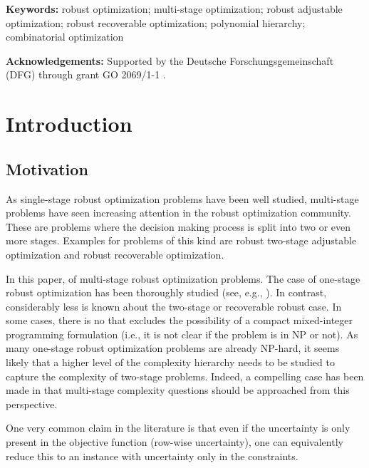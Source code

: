 \documentclass[a4paper,abstracton]{scrartcl}
\begin{document}
\noindent\textbf{Keywords:} robust optimization; multi-stage optimization; robust adjustable optimization; robust recoverable optimization; polynomial hierarchy; combinatorial optimization

\noindent\textbf{Acknowledgements:} Supported by the Deutsche Forschungsgemeinschaft (DFG) through grant GO 2069/1-1 .



\section{Introduction}

\subsection{Motivation}

As single-stage robust optimization problems have been well studied, multi-stage problems have seen increasing attention in the robust optimization community. These are problems where the decision making process is split into two or even more stages. Examples for problems of this kind are robust two-stage adjustable optimization and robust recoverable optimization.

In this paper,  of multi-stage robust optimization problems. The case of one-stage robust optimization has been thoroughly studied (see, e.g., \cite{kasperski2016robust}). In contrast, considerably less is known about the two-stage or recoverable robust case. In some cases, there is no
that excludes the possibility of a compact mixed-integer programming formulation (i.e., it is not clear if the problem is in NP or not). As many one-stage robust optimization problems are already NP-hard, it seems likely that a higher level of the complexity hierarchy \cite{stockmeyer1976polynomial} needs to be studied to capture the complexity of two-stage problems. Indeed, a compelling case has been made in \cite{woeginger2021trouble} that multi-stage complexity questions should be approached from this perspective.

One very common claim in the literature is that even if the uncertainty 
is only present in the objective function (row-wise uncertainty), one can equivalently reduce this to an instance with uncertainty only in the constraints.
\end{document}

